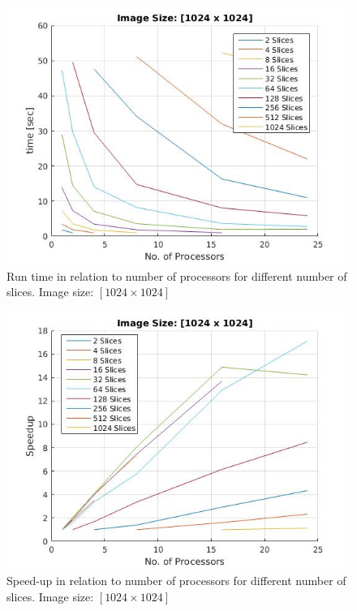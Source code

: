 \documentclass[a4paper,12pt]{article}
\begin{document}
\begin{figure}
  \centering
  \includegraphics[scale=0.8]{large_one_node_1.jpg}
  \caption{Run time in relation to number of processors for different number of slices. Image size: $[1024 \times 1024]$}
  \label{l_one_n}
\end{figure}

\begin{figure}
  \centering
  \includegraphics[scale=0.8]{large_one_node_speedup.jpg}
  \caption{Speed-up in relation to number of processors for different number of slices. Image size: $[1024 \times 1024]$}
  \label{l_one_n_speed}
\end{figure}
\end{document}
